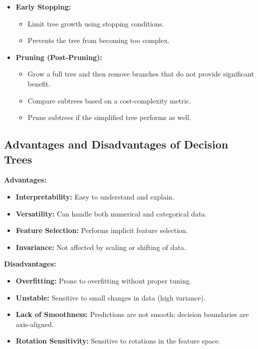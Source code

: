 \documentclass{article}
\begin{document}
\begin{itemize}
    \item \textbf{Early Stopping:}
    \begin{itemize}
        \item Limit tree growth using stopping conditions.
        \item Prevents the tree from becoming too complex.
    \end{itemize}
    \item \textbf{Pruning (Post-Pruning):}
    \begin{itemize}
        \item Grow a full tree and then remove branches that do not provide significant benefit.
        \item Compare subtrees based on a cost-complexity metric.
        \item Prune subtrees if the simplified tree performs as well.
    \end{itemize}
\end{itemize}

\subsection{Advantages and Disadvantages of Decision Trees}

\textbf{Advantages:}

\begin{itemize}
    \item \textbf{Interpretability:} Easy to understand and explain.
    \item \textbf{Versatility:} Can handle both numerical and categorical data.
    \item \textbf{Feature Selection:} Performs implicit feature selection.
    \item \textbf{Invariance:} Not affected by scaling or shifting of data.
\end{itemize}

\textbf{Disadvantages:}

\begin{itemize}
    \item \textbf{Overfitting:} Prone to overfitting without proper tuning.
    \item \textbf{Unstable:} Sensitive to small changes in data (high variance).
    \item \textbf{Lack of Smoothness:} Predictions are not smooth; decision boundaries are axis-aligned.
    \item \textbf{Rotation Sensitivity:} Sensitive to rotations in the feature space.
\end{itemize}
\end{document}
